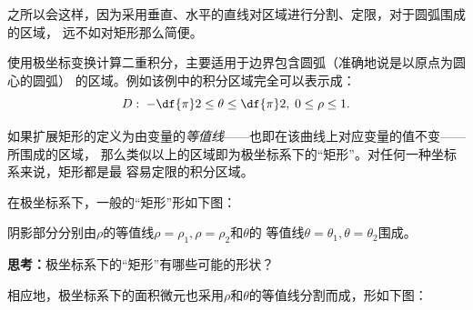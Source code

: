 之所以会这样，因为采用垂直、水平的直线对区域进行分割、定限，对于圆弧围成的区域，
远不如对矩形那么简便。

使用极坐标变换计算二重积分，主要适用于边界包含圆弧（准确地说是以原点为圆心的圆弧）
的区域。例如该例中的积分区域完全可以表示成：
$$D:\;-\df{\pi}2\leq\theta\leq\df{\pi}2,
\;0\leq\rho\leq1.$$

如果扩展矩形的定义为由变量的{\it 等值线}——也即在该曲线上对应变量的值不变——所围成的区域，
那么类似以上的区域即为极坐标系下的“矩形”。对任何一种坐标系来说，矩形都是最
容易定限的积分区域。

在极坐标系下，一般的“矩形”形如下图：

\begin{center}
\end{center}

阴影部分分别由$\rho$的等值线$\rho=\rho_1,\rho=\rho_2$和$\theta$的
等值线$\theta=\theta_1,\theta=\theta_2$围成。

{\bf 思考：}极坐标系下的“矩形”有哪些可能的形状？

相应地，极坐标系下的面积微元也采用$\rho$和$\theta$的等值线分割而成，形如下图：

